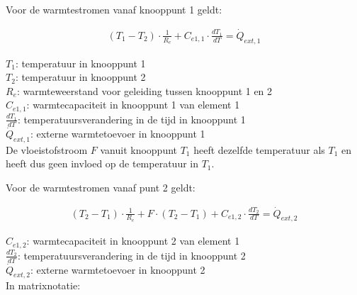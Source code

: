 Voor de warmtestromen vanaf knooppunt 1 geldt:

\begin{equation}
	\begin{aligned}
		(T_1 - T_2) \cdot \frac{1}{R_e} + C_{e1,1} \cdot \frac{dT_1}{dT} = \dot{Q}_{ext,1}	    	
	\end{aligned}
\end{equation}

$T_1$: temperatuur in knooppunt 1 \\
$T_2$: temperatuur in knooppunt 2 \\
$R_e$: warmteweerstand voor geleiding tussen knooppunt 1 en 2 \\
$C_{e1,1}$: warmtecapaciteit in knooppunt 1 van element 1 \\
$\frac{dT_1}{dT}$: temperatuursverandering in de tijd in knooppunt 1 \\
$\dot{Q}_{ext,1}$: externe warmtetoevoer in knooppunt 1 \\

De vloeistofstroom $F$ vanuit knooppunt $T_1$ heeft dezelfde temperatuur als $T_1$ en heeft dus geen invloed op de temperatuur in $T_1$.

Voor de warmtestromen vanaf punt 2 geldt:

\begin{equation}
	\begin{aligned}
		(T_2 - T_1) \cdot \frac{1}{R_e} + F \cdot (T_2 - T_1) + C_{e1,2} \cdot \frac{dT_2}{dT} = \dot{Q}_{ext,2}	    	
	\end{aligned}
\end{equation}

$C_{e1,2}$: warmtecapaciteit in knooppunt 2 van element 1 \\
$\frac{dT_2}{dT}$: temperatuursverandering in de tijd in knooppunt 2 \\
$\dot{Q}_{ext,2}$: externe warmtetoevoer in knooppunt 2 \\

In matrixnotatie:

